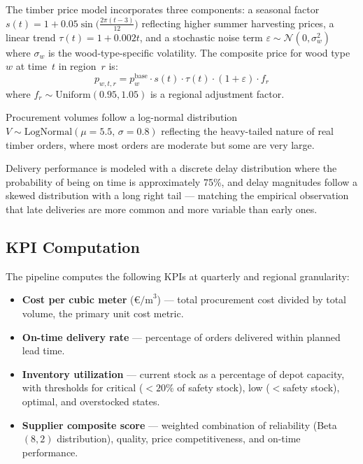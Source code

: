 \documentclass[11pt,a4paper]{article}
\begin{document}
The timber price model incorporates three components: a seasonal factor $s(t) = 1 + 0.05 \sin\!\bigl(\frac{2\pi(t-3)}{12}\bigr)$ reflecting higher summer harvesting prices, a linear trend $\tau(t) = 1 + 0.002t$, and a stochastic noise term $\varepsilon \sim \mathcal{N}(0, \sigma_w^2)$ where $\sigma_w$ is the wood-type-specific volatility. The composite price for wood type~$w$ at time~$t$ in region~$r$ is:
\begin{equation}
    p_{w,t,r} = p_w^{\text{base}} \cdot s(t) \cdot \tau(t) \cdot (1 + \varepsilon) \cdot f_r
    \label{eq:price}
\end{equation}
where $f_r \sim \text{Uniform}(0.95, 1.05)$ is a regional adjustment factor.

Procurement volumes follow a log-normal distribution $V \sim \text{LogNormal}(\mu=5.5,\, \sigma=0.8)$ reflecting the heavy-tailed nature of real timber orders, where most orders are moderate but some are very large.

Delivery performance is modeled with a discrete delay distribution where the probability of being on time is approximately 75\%, and delay magnitudes follow a skewed distribution with a long right tail --- matching the empirical observation that late deliveries are more common and more variable than early ones.

\subsection{KPI Computation}

The pipeline computes the following KPIs at quarterly and regional granularity:

\begin{itemize}[leftmargin=2em]
    \item \textbf{Cost per cubic meter} ($\text{€/m}^3$) --- total procurement cost divided by total volume, the primary unit cost metric.
    \item \textbf{On-time delivery rate} --- percentage of orders delivered within planned lead time.
    \item \textbf{Inventory utilization} --- current stock as a percentage of depot capacity, with thresholds for critical ($<20\%$ of safety stock), low ($<$safety stock), optimal, and overstocked states.
    \item \textbf{Supplier composite score} --- weighted combination of reliability (Beta$(8,2)$ distribution), quality, price competitiveness, and on-time performance.
\end{itemize}
\end{document}
